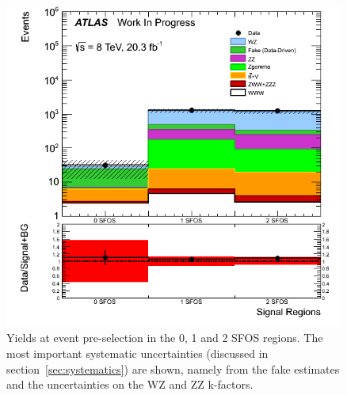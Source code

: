 \begin{figure}[ht!]
\centering
\includegraphics[width=0.995\textwidth]{figures/SFOSPreselection.png}
\caption{Yields at event pre-selection in the 0, 1 and 2 SFOS regions.  
The most important systematic uncertainties 
(discussed in section~\ref{sec:systematics}) are shown, 
namely from the fake estimates and the uncertainties on the WZ and ZZ k-factors.}
\label{fig:preselection_nsfos}
\end{figure}

